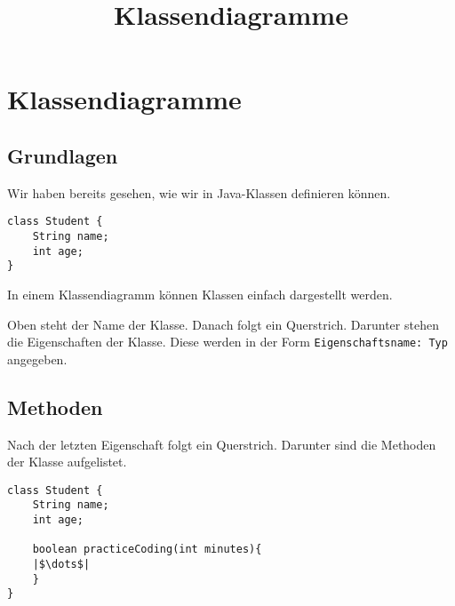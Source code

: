 \documentclass[a4paper]{scrartcl}
\date{}
\title{Klassendiagramme}
\begin{document}
\section*{Klassendiagramme}
\subsection*{Grundlagen}
Wir haben bereits gesehen, wie wir in Java-Klassen definieren können.

\begin{verbatim}
class Student {
    String name;
    int age;
}
\end{verbatim}
\noindent
In einem Klassendiagramm können Klassen einfach dargestellt werden.
\begin{center}
\end{center}
Oben steht der Name der Klasse. Danach folgt ein Querstrich. Darunter stehen
die Eigenschaften der Klasse. Diese werden in der Form \texttt{Eigenschaftsname: Typ} angegeben.



\subsection*{Methoden}
Nach der letzten Eigenschaft folgt ein Querstrich. Darunter sind die Methoden der Klasse aufgelistet.


\begin{verbatim}
class Student {
    String name;
    int age;

    boolean practiceCoding(int minutes){
	|$\dots$|
    }
}
\end{verbatim}





\begin{center}
\end{center}
\end{document}
